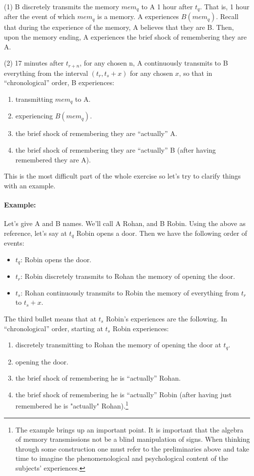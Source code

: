 \documentclass{article}
\begin{document}
\noindent (1) B discretely transmits the memory $mem_q$ to A 1 hour after $t_q$. That is, 1 hour after the event of which $mem_q$ is a memory. A experiences $B(mem_q)$. Recall that during the experience of the memory, A believes that they are B. Then, upon the memory ending, A experiences the brief shock of remembering they are A.

\vspace{1em} %

\noindent (2) 17 minutes after $t_{r+n}$, for any chosen n, A continuously transmits to B everything from the interval $(t_{r}, t_s+x)$ for any chosen $x$, so that in ``chronological'' order, B experiences: 
\begin{enumerate}
    \item transmitting $mem_q$ to A.
    \item experiencing $B(mem_q)$.
    \item the brief shock of remembering they are ``actually'' A.
    \item the brief shock of remembering they are ``actually'' B (after having remembered they are A).
\end{enumerate} 
\vspace{1em}
\noindent This is the most difficult part of the whole exercise so let's try to clarify things with an example.
\paragraph{Example:}
Let's give A and B names. We'll call A Rohan, and B Robin. Using the above as reference, let's say at $t_q$ Robin opens a door. Then we have the following order of events:
\begin{itemize}
    \item $t_q$: Robin opens the door.
    \item $t_r$: Robin discretely transmits to Rohan the memory of opening the door.
    \item $t_s$: Rohan continuously transmits to Robin the memory of everything from $t_r$ to $t_{s}+x$.
\end{itemize}
The third bullet means that at $t_s$ Robin's experiences are the following. In ``chronological'' order, starting at $t_s$ Robin experiences:
\begin{enumerate}
    \item discretely transmitting to Rohan the memory of opening the door at $t_q$.
    \item opening the door.
    \item the brief shock of remembering he is ``actually'' Rohan.
    \item the brief shock of remembering he is ``actually'' Robin (after having just remembered he is "actually" Rohan).\footnote{The example brings up an important point. It is important that the algebra of memory transmissions not be a blind manipulation of signs. When thinking through some construction one must refer to the preliminaries above and take time to imagine the phenomenological and psychological content of the subjects' experiences.}
\end{enumerate}
\end{document}
